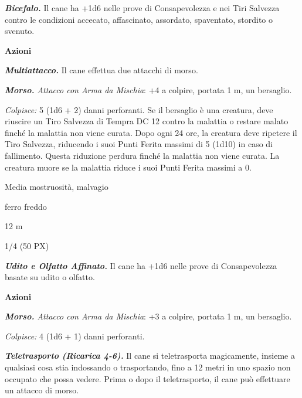 \begin{multicols}{2}
{\emph{\textbf{Bicefalo.}} Il cane ha +1d6 nelle prove di Consapevolezza e nei Tiri Salvezza contro le condizioni accecato, affascinato, assordato, spaventato, stordito o svenuto.

\textbf{Azioni}

\emph{\textbf{Multiattacco.}} Il cane effettua due attacchi di morso.

\emph{\textbf{Morso.} Attacco con Arma da Mischia}: +4 a colpire, portata 1 m, un bersaglio.

\emph{Colpisce:} 5 (1d6 + 2) danni perforanti. Se il bersaglio è una creatura, deve riuscire un Tiro Salvezza di Tempra DC 12 contro la malattia o restare malato finché la malattia non viene curata. Dopo ogni 24 ore, la creatura deve ripetere il Tiro Salvezza, riducendo i suoi Punti Ferita massimi di 5 (1d10) in caso di fallimento. Questa riduzione perdura finché la malattia non viene curata. La creatura muore se la malattia riduce i suoi Punti Ferita massimi a 0.

\begin{description}[noitemsep, topsep=0pt, parsep=0pt, partopsep=0pt, itemsep=1pt, leftmargin=2.35cm,  labelwidth=2.2cm, itemindent=0cm, listparindent=0pt] %
\setlength{\baselineskip}{10pt}
\item[\textbf{Taglia/Tipo}] Media mostruosità, malvagio
\item[\textbf{Caratt.}] 
\item[\textbf{Punti Ferita}] 
\item[\textbf{Vul. al Danno}] ferro freddo
\item[\textbf{Tiri Salvez.}] 
\item[\textbf{Movimento}] 12 m
\item[\textbf{Sfida}] 1/4 (50 PX)
\end{description}
\smallskip

\emph{\textbf{Udito e Olfatto Affinato.}} Il cane ha +1d6 nelle prove di Consapevolezza basate su udito o olfatto.

\textbf{Azioni}

\emph{\textbf{Morso.} Attacco con Arma da Mischia}: +3 a colpire, portata 1 m, un bersaglio.

\emph{Colpisce:} 4 (1d6 + 1) danni perforanti.

\emph{\textbf{Teletrasporto (Ricarica 4-6).}} Il cane si teletrasporta magicamente, insieme a qualsiasi cosa stia indossando o trasportando, fino a 12 metri in uno spazio non occupato che possa vedere. Prima o dopo il teletrasporto, il cane può effettuare un attacco di morso.

}
\end{multicols}
